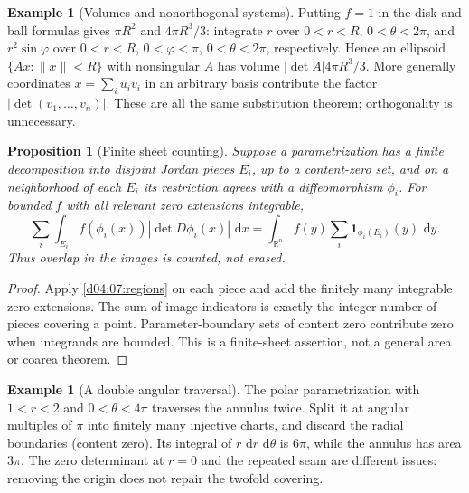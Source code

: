 \documentclass[11pt,oneside,openany]{book}
\newtheorem{proposition}[theorem]{Proposition}
\theoremstyle{definition}
\newtheorem{example}[theorem]{Example}
\theoremstyle{remark}
\newcommand{\R}{\mathbb R}
\newcommand{\norm}[1]{\lVert#1\rVert}
\newcommand{\dd}{\,\mathrm d}
\newcommand{\family}[1]{}
\begin{document}
\begin{example}[Volumes and nonorthogonal systems]\label{d04:07:volumes}
Putting $f=1$ in the disk and ball formulas gives $\pi R^2$ and $4\pi R^3/3$: integrate $r$ over $0<r<R$, $0<\theta<2\pi$, and $r^2\sin\varphi$ over $0<r<R$, $0<\varphi<\pi$, $0<\theta<2\pi$, respectively. Hence an ellipsoid $\{Ax:\norm x<R\}$ with nonsingular $A$ has volume $|\det A|4\pi R^3/3$. More generally coordinates $x=\sum_i u_i v_i$ in an arbitrary basis contribute the factor $|\det(v_1,\ldots,v_n)|$. These are all the same substitution theorem; orthogonality is unnecessary.
\end{example}

\family{K04.07.09}
\begin{proposition}[Finite sheet counting]\label{d04:07:multiplicity}
Suppose a parametrization has a finite decomposition into disjoint Jordan pieces $E_i$, up to a content-zero set, and on a neighborhood of each $E_i$ its restriction agrees with a diffeomorphism $\phi_i$. For bounded $f$ with all relevant zero extensions integrable,
\[
 \sum_i\int_{E_i}f(\phi_i(x))|\det D\phi_i(x)|\,\dd x
 =\int_{\R^n} f(y)\sum_i\mathbf1_{\phi_i(E_i)}(y)\,\dd y.
\]
Thus overlap in the images is counted, not erased.
\end{proposition}
\begin{proof}
Apply \cref{d04:07:regions} on each piece and add the finitely many integrable zero extensions. The sum of image indicators is exactly the integer number of pieces covering a point. Parameter-boundary sets of content zero contribute zero when integrands are bounded. This is a finite-sheet assertion, not a general area or coarea theorem.
\end{proof}

\begin{example}[A double angular traversal]\label{d04:07:double-angle}
The polar parametrization with $1<r<2$ and $0<\theta<4\pi$ traverses the annulus twice. Split it at angular multiples of $\pi$ into finitely many injective charts, and discard the radial boundaries (content zero). Its integral of $r\,\dd r\,\dd\theta$ is $6\pi$, while the annulus has area $3\pi$. The zero determinant at $r=0$ and the repeated seam are different issues: removing the origin does not repair the twofold covering.
\end{example}
\end{document}
